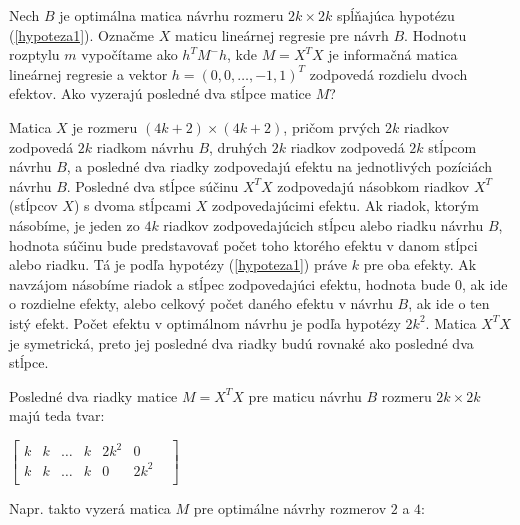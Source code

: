 \begin{dokaz}
Nech $B$ je optimálna matica návrhu rozmeru $2k \times 2k$ spĺňajúca hypotézu (\ref{hypoteza1}). Označme $X$ maticu lineárnej regresie pre návrh $B$. Hodnotu rozptylu $m$ vypočítame ako $h^T M^- h$,
kde $M = X^T X$ je informačná matica lineárnej regresie a vektor $h = (0, 0, \ldots, -1, 1)^T $ zodpovedá rozdielu dvoch efektov. Ako vyzerajú posledné dva stĺpce matice $M$?

Matica $X$ je rozmeru $(4k + 2) \times (4k + 2)$, pričom prvých $2k$ riadkov zodpovedá $2k$ riadkom návrhu $B$, druhých $2k$ riadkov zodpovedá $2k$ stĺpcom návrhu $B$,
a posledné dva riadky zodpovedajú efektu na jednotlivých pozíciách návrhu $B$. Posledné dva stĺpce súčinu $X^T X$ zodpovedajú násobkom riadkov $X^T$ (stĺpcov $X$) s dvoma stĺpcami $X$ zodpovedajúcimi efektu.
Ak riadok, ktorým násobíme, je jeden zo $4k$ riadkov zodpovedajúcich stĺpcu alebo riadku návrhu $B$, hodnota súčinu bude predstavovať počet toho ktorého efektu v danom stĺpci alebo riadku.
Tá je podľa hypotézy (\ref{hypoteza1}) práve $k$ pre oba efekty. Ak navzájom násobíme riadok a stĺpec zodpovedajúci efektu, hodnota bude $0$, ak ide o rozdielne efekty,
alebo celkový počet daného efektu v návrhu $B$, ak ide o ten istý efekt. Počet efektu v optimálnom návrhu je podľa hypotézy $2k^2$.
Matica $X^T X$ je symetrická, preto jej posledné dva riadky budú rovnaké ako posledné dva stĺpce.

Posledné dva riadky matice $M = X^T X$ pre maticu návrhu $B$ rozmeru $2k \times 2k$ majú teda tvar:

\begin{center}
$
\begin{bmatrix}
k & k & \ldots & k & 2k^2 & 0 & \\
k & k & \ldots & k & 0 & 2k^2 & \\
\end{bmatrix}
$
\end{center}

Napr. takto vyzerá matica $M$ pre optimálne návrhy rozmerov $2$ a $4$:


\end{dokaz}
